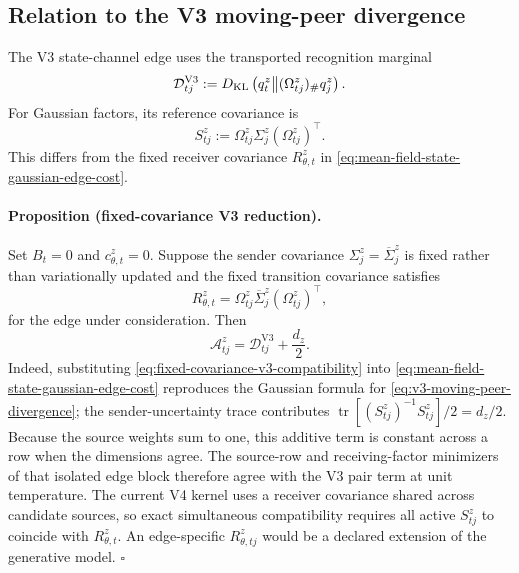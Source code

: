 \subsection{Relation to the V3 moving-peer divergence}

The V3 state-channel edge uses the transported recognition marginal
\begin{equation}
\mathcal D_{tj}^{\mathrm{V3}}
:=D_{\mathrm{KL}}\left(
q_t^z
\middle\Vert
(\Omega_{tj}^z)_\#q_j^z
\right).
\label{eq:v3-moving-peer-divergence}
\end{equation}
For Gaussian factors, its reference covariance is
\begin{equation}
S_{tj}^z
:=\Omega_{tj}^z\Sigma_j^z(\Omega_{tj}^z)^\top.
\label{eq:v3-transported-sender-covariance}
\end{equation}
This differs from the fixed receiver covariance $R_{\theta,t}^z$ in \cref{eq:mean-field-state-gaussian-edge-cost}.

\paragraph{Proposition (fixed-covariance V3 reduction).}
Set $B_t=0$ and $c_{\theta,t}^z=0$. Suppose the sender covariance $\Sigma_j^z=\overline\Sigma_j^z$ is fixed rather than variationally updated and the fixed transition covariance satisfies
\begin{equation}
R_{\theta,t}^z
=\Omega_{tj}^z\overline\Sigma_j^z(\Omega_{tj}^z)^\top
,
\label{eq:fixed-covariance-v3-compatibility}
\end{equation}
for the edge under consideration. Then
\begin{equation}
\mathcal A_{tj}^z
=\mathcal D_{tj}^{\mathrm{V3}}+\frac{d_z}{2}.
\label{eq:mean-field-fixed-covariance-v3-reduction}
\end{equation}
Indeed, substituting \cref{eq:fixed-covariance-v3-compatibility} into \cref{eq:mean-field-state-gaussian-edge-cost} reproduces the Gaussian formula for \cref{eq:v3-moving-peer-divergence}; the sender-uncertainty trace contributes $\operatorname{tr}[(S_{tj}^z)^{-1}S_{tj}^z]/2=d_z/2$. Because the source weights sum to one, this additive term is constant across a row when the dimensions agree. The source-row and receiving-factor minimizers of that isolated edge block therefore agree with the V3 pair term at unit temperature. The current V4 kernel uses a receiver covariance shared across candidate sources, so exact simultaneous compatibility requires all active $S_{tj}^z$ to coincide with $R_{\theta,t}^z$. An edge-specific $R_{\theta,tj}^z$ would be a declared extension of the generative model. \hfill$\square$


